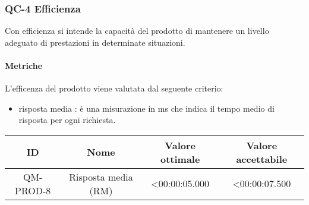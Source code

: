 \subsubsection{QC-4 Efficienza}
Con efficienza si intende la capacità del prodotto di mantenere un livello adeguato di prestazioni in determinate situazioni.
	
	\paragraph{Metriche}
	L'efficenza del prodotto viene valutata dal seguente criterio:
	\begin{itemize}
		\item risposta media : è una misurazione in ms che indica il tempo medio di risposta per ogni richiesta.
	\end{itemize}
	\begin{center}
		\begin{tabular}{|c|c|c|c|}
			\rowcolor{lighter-grayer}
			\hline
			ID & Nome & Valore ottimale & Valore accettabile \\
			\hline
			QM-PROD-8 & Risposta media (RM) & <00:00:05.000 & <00:00:07.500 \\
			\hline
		\end{tabular}
	\end{center}

